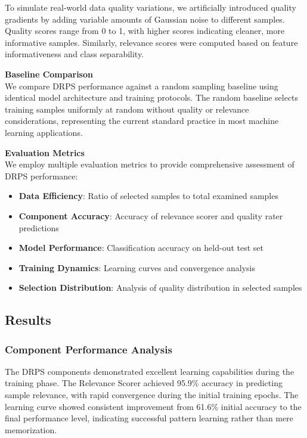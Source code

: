 \documentclass[12pt]{article}
\begin{document}
To simulate real-world data quality variations, we artificially introduced quality gradients by adding variable amounts of Gaussian noise to different samples. Quality scores range from 0 to 1, with higher scores indicating cleaner, more informative samples. Similarly, relevance scores were computed based on feature informativeness and class separability.

\textbf{Baseline Comparison} \\
We compare DRPS performance against a random sampling baseline using identical model architecture and training protocols. The random baseline selects training samples uniformly at random without quality or relevance considerations, representing the current standard practice in most machine learning applications.

\textbf{Evaluation Metrics} \\
We employ multiple evaluation metrics to provide comprehensive assessment of DRPS performance:

\begin{itemize}
\item \textbf{Data Efficiency}: Ratio of selected samples to total examined samples
\item \textbf{Component Accuracy}: Accuracy of relevance scorer and quality rater predictions
\item \textbf{Model Performance}: Classification accuracy on held-out test set
\item \textbf{Training Dynamics}: Learning curves and convergence analysis
\item \textbf{Selection Distribution}: Analysis of quality distribution in selected samples
\end{itemize}

\subsection{Results}\label{results}

\subsubsection{Component Performance Analysis}\label{component-performance}

The DRPS components demonstrated excellent learning capabilities during the training phase. The Relevance Scorer achieved 95.9\% accuracy in predicting sample relevance, with rapid convergence during the initial training epochs. The learning curve showed consistent improvement from 61.6\% initial accuracy to the final performance level, indicating successful pattern learning rather than mere memorization.
\end{document}
